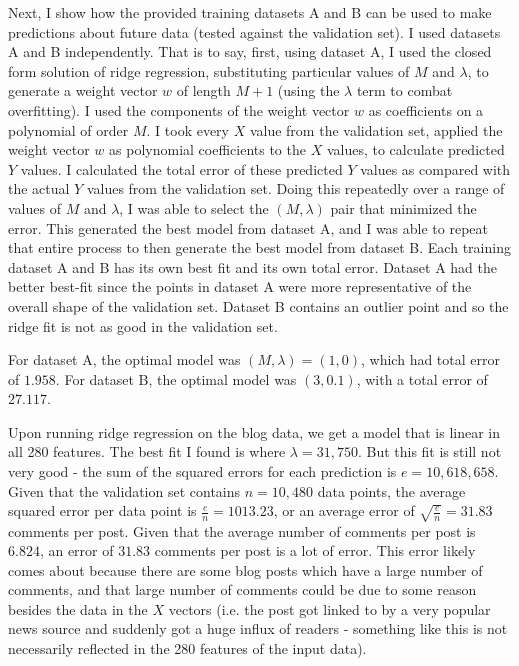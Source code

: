 \documentclass{paper}
\begin{document}
Next, I show how the provided training datasets A and B can be used to make predictions about future data (tested against the validation set). I used datasets A and B independently. That is to say, first, using dataset A, I used the closed form solution of ridge regression, substituting particular values of $M$ and $\lambda$, to generate a weight vector $w$ of length $M+1$ (using the $\lambda$ term to combat overfitting). I used the components of the weight vector $w$ as coefficients on a polynomial of order $M$. I took every $X$ value from the validation set, applied the weight vector $w$ as polynomial coefficients to the $X$ values, to calculate predicted $Y$ values. I calculated the total error of these predicted $Y$ values as compared with the actual $Y$ values from the validation set. Doing this repeatedly over a range of values of $M$ and $\lambda$, I was able to select the $(M, \lambda)$ pair that minimized the error. This generated the best model from dataset A, and I was able to repeat that entire process to then generate the best model from dataset B. Each training dataset A and B has its own best fit and its own total error. Dataset A had the better best-fit since the points in dataset A were more representative of the overall shape of the validation set. Dataset B contains an outlier point and so the ridge fit is not as good in the validation set.

For dataset A, the optimal model was $(M, \lambda) = (1, 0)$, which had total error of $1.958$. For dataset B, the optimal model was $(3, 0.1)$, with a total error of $27.117$.

Upon running ridge regression on the blog data, we get a model that is linear in all 280 features. The best fit I found is where $\lambda = 31,750$. But this fit is still not very good - the sum of the squared errors for each prediction is $e = 10,618,658$. Given that the validation set contains $n=10,480$ data points, the average squared error per data point is $\frac{e}{n} = 1013.23$, or an average error of $\sqrt{\frac{e}{n}} = 31.83$ comments per post. Given that the average number of comments per post is $6.824$, an error of $31.83$ comments per post is a lot of error. This error likely comes about because there are some blog posts which have a large number of comments, and that large number of comments could be due to some reason besides the data in the $X$ vectors (i.e. the post got linked to by a very popular news source and suddenly got a huge influx of readers - something like this is not necessarily reflected in the 280 features of the input data). 
\end{document}
